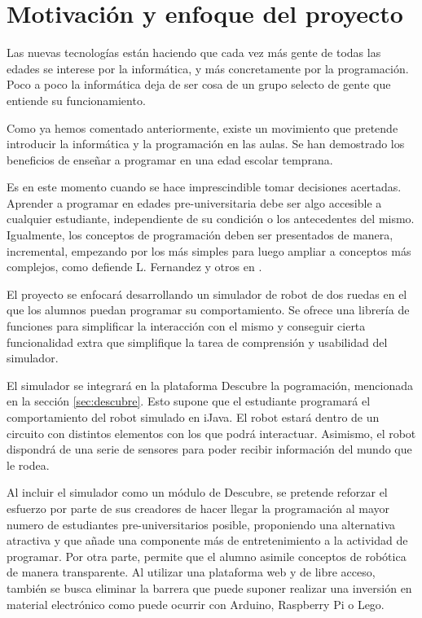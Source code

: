 \section{Motivación y enfoque del proyecto}
\label{sec:motivacion}

Las nuevas tecnologías están haciendo que cada vez más gente de todas las edades se interese por la informática, y más concretamente por la programación. Poco a poco la informática deja de ser cosa de un grupo selecto {\color{red}de gente que entiende su funcionamiento}.

Como ya hemos comentado anteriormente, existe un movimiento que pretende introducir la informática y la programación en las aulas. Se han demostrado los beneficios de enseñar a programar en una edad escolar temprana.

Es en este momento cuando se hace imprescindible tomar decisiones acertadas. Aprender a programar en edades pre-universitaria debe ser algo accesible a cualquier estudiante, independiente de su condición o los antecedentes del mismo. Igualmente, los conceptos de programación deben ser presentados de manera, incremental, empezando por los más simples para luego ampliar a conceptos más complejos, como defiende L. Fernandez y otros en \cite{fernandez2002analisis}.

El proyecto se enfocará desarrollando un simulador de robot de dos ruedas en el que los alumnos puedan programar su comportamiento. Se ofrece una librería de funciones para simplificar la interacción con el mismo y conseguir cierta funcionalidad extra que simplifique la tarea de comprensión y usabilidad del simulador.

El simulador se integrará en la plataforma Descubre la pogramación, mencionada en la sección \ref{sec:descubre}. Esto supone que el estudiante programará el comportamiento del robot simulado en iJava. El robot estará dentro de un circuito con distintos elementos con los que podrá interactuar. Asimismo, el robot dispondrá de una serie de sensores para poder recibir información del mundo que le rodea.

Al incluir el simulador como un módulo de Descubre, se pretende reforzar el esfuerzo por parte de sus creadores de hacer llegar la programación al mayor numero de estudiantes pre-universitarios posible, proponiendo una alternativa atractiva y que añade una componente más de entretenimiento a la actividad de programar. {\color{red}Por otra parte, permite que el alumno asimile conceptos de robótica de manera transparente. Al utilizar una plataforma web y de libre acceso, también se busca eliminar la barrera que puede suponer realizar una inversión en material electrónico como puede ocurrir con Arduino, Raspberry Pi o Lego.
}

